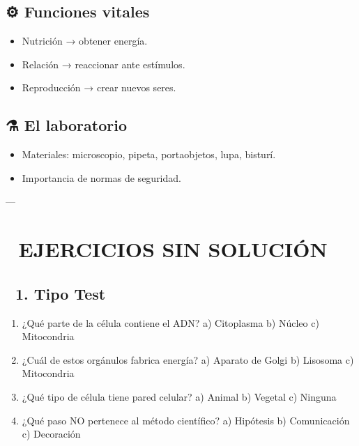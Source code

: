 \documentclass[a4paper,12pt]{article}
\begin{document}
\subsection*{⚙️ Funciones vitales}
\begin{itemize}
    \item Nutrición → obtener energía.
    \item Relación → reaccionar ante estímulos.
    \item Reproducción → crear nuevos seres.
\end{itemize}

\subsection*{⚗️ El laboratorio}
\begin{itemize}
    \item Materiales: microscopio, pipeta, portaobjetos, lupa, bisturí.
    \item Importancia de normas de seguridad.
\end{itemize}

---

\section*{🎯 EJERCICIOS SIN SOLUCIÓN}

\subsection*{🧩 1. Tipo Test}
\begin{enumerate}[label=\arabic*)]
    \item ¿Qué parte de la célula contiene el ADN?  
    a) Citoplasma \hspace{1cm} b) Núcleo \hspace{1cm} c) Mitocondria
    \item ¿Cuál de estos orgánulos fabrica energía?  
    a) Aparato de Golgi \hspace{1cm} b) Lisosoma \hspace{1cm} c) Mitocondria
    \item ¿Qué tipo de célula tiene pared celular?  
    a) Animal \hspace{1cm} b) Vegetal \hspace{1cm} c) Ninguna
    \item ¿Qué paso NO pertenece al método científico?  
    a) Hipótesis \hspace{1cm} b) Comunicación \hspace{1cm} c) Decoración
\end{enumerate}
\end{document}
